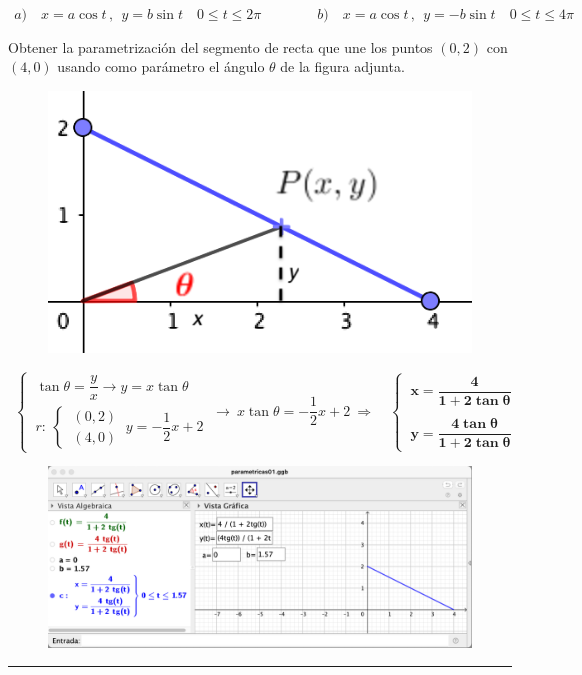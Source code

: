 $ \ \ a)\quad x=a\cos t\, , \ \ y=b\sin t \quad 0\le t\le 2\pi \qquad \qquad b)\quad x=a\cos t\, , \ \ y=-b\sin t \quad 0\le t\le 4\pi$


\begin{mipropuesto} 

\begin{multicols}{2}
Obtener la parametrización del segmento de recta que une los puntos $(0,2)$ con $(4,0)$ usando como parámetro el ángulo $\theta$ de la figura adjunta.
\begin{figure}[H]
	\centering
	\includegraphics[width=.25\textwidth]{img-polares/polares15.png}
	\end{figure}	
\end{multicols}
\end{mipropuesto}

$\ \ \begin{cases}
\ \tan \theta =\dfrac y x \to y=x\tan \theta \\
\ r:\ \begin{cases} \ (0,2) \\ \ (4,0) \end{cases} \ y=-\dfrac 1 2 x + 2
\end{cases} \ \to \ x\tan \theta =-\dfrac 1 2 x + 2 \ \Rightarrow  \quad \begin{cases} 
 \ \boldsymbol{x=\dfrac{4}{1+2\tan \theta}}	 \\  \\ \ \boldsymbol{y=\dfrac{4\tan \theta}{1+2\tan \theta}}
 \end{cases}$


\begin{figure}[H]
	\centering
	\includegraphics[width=.75\textwidth]{img-polares/polares14.png}
	\end{figure}

\vspace{-5mm}
\begin{flushright}\textcolor{teal}{\rule{250pt}{0.2pt}}	\end{flushright}\vspace{5mm}


